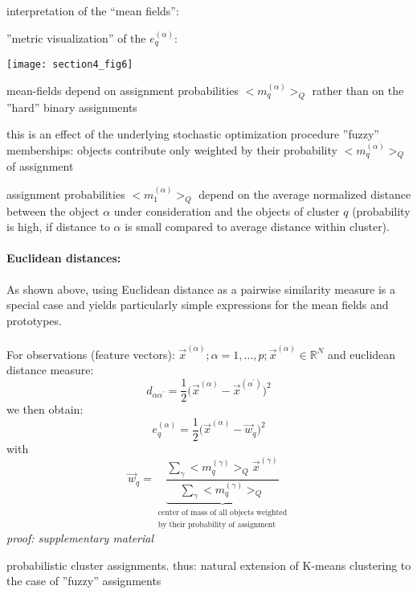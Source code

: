 interpretation of the ``mean fields'':
\begin{itemize}
  \itR ''metric visualization'' of the $e_q^{(\alpha)}$:
  \begin{center}
    \texttt{[image: section4\_fig6]}
  \end{center}
  \itR mean-fields depend on assignment probabilities $\big<
  m_q^{(\alpha)} \big>_Q$ rather than on the ''hard'' binary
  assignments
  \begin{itemize}
    \itl this is an effect of the underlying stochastic optimization
    procedure \itl ''fuzzy'' memberships: objects contribute only
    weighted by their probability $\big< m_q^{(\alpha)} \big>_Q$ of
    assignment
  \end{itemize}
  \itR assignment probabilities $\big< m_1^{(\alpha)} \big>_Q$ depend
  on the average normalized distance between the object $\alpha$ under
  consideration and the objects of cluster $q$ (probability is high,
  if distance to $\alpha$ is small compared to average distance within
  cluster).  
\end{itemize}

\paragraph{Euclidean distances:} As shown above, using Euclidean distance as a pairwise similarity measure is a special case and yields particularly simple expressions for the mean fields and prototypes.
\\\\
For observations (feature vectors): $\vec{x}^{(\alpha)}; \alpha = 1,
\ldots, p; \vec{x}^{(\alpha)} \in \mathbb{R}^N$ and euclidean distance
measure:
\begin{equation}
	d_{\alpha \alpha^{'}} 
	= \frac{1}{2} \big( \vec{x}^{(\alpha)} - \vec{x}^{(\alpha^{'})}
		\big)^2
\end{equation}
we then obtain:
\begin{equation}
	e_q^{(\alpha)} 
	= \frac{1}{2} \big( \vec{x}^{(\alpha)} - \vec{w}_q \big)^2
\end{equation}
with
\begin{equation}
	\vec{w}_q 
	= \underbrace{ \frac{\sum\limits_{\gamma} \big< m_q^{(\gamma)} \big>_Q 
		\vec{x}^{(\gamma)}}{\sum\limits_{\gamma}
		\big< m_q^{(\gamma)} \big>_Q} }_{
		\substack{	\text{center of mass of all objects weighted} \\
				\text{by their probability of assignment}} }
\end{equation}
{\it proof: supplementary material}
\begin{itemize}
      \itl probabilistic cluster assignments. thus:
	\itl natural extension of K-means clustering to the case of ''fuzzy''
		assignments
\end{itemize}

